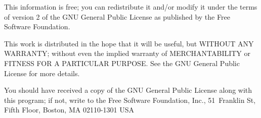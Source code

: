 
This information is free; you can redistribute it and/or modify
it under the terms of version 2 of the GNU General Public License as
published by the Free Software Foundation.

This work is distributed in the hope that it will be useful,
but WITHOUT ANY WARRANTY; without even the implied warranty of
MERCHANTABILITY or FITNESS FOR A PARTICULAR PURPOSE.  See the
GNU General Public License for more details.

You should have received a copy of the GNU General Public License
along with this program; if not, write to the Free Software
Foundation, Inc., 51~Franklin St, Fifth Floor, Boston, MA  02110-1301  USA
